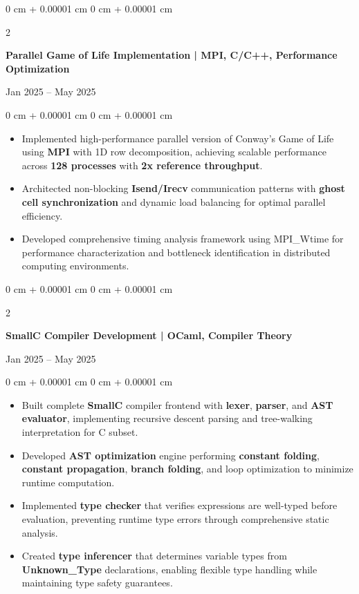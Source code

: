 \documentclass[10pt, letterpaper]{article}
\newenvironment{highlights}{
    \begin{itemize}[
        topsep=0.05 cm,
        parsep=0.05 cm,
        partopsep=0pt,
        itemsep=0pt,
        leftmargin=0 cm + 10pt
    ]
}{
    \end{itemize}
}
\newenvironment{onecolentry}{
    \begin{adjustwidth}{
        0 cm + 0.00001 cm
    }{
        0 cm + 0.00001 cm
    }
}{
    \end{adjustwidth}
}
\newenvironment{twocolentry}[2][]{
    \onecolentry
    \def\secondColumn{#2}
    \setcolumnwidth{\fill, 4.5 cm}
    \begin{paracol}{2}
}{
    \switchcolumn \raggedleft \secondColumn
    \end{paracol}
    \endonecolentry
}
\begin{document}
        \vspace{0.10 cm}
        \begin{twocolentry}{
            Jan 2025 – May 2025
        }
            \textbf{Parallel Game of Life Implementation | MPI, C/C++, Performance Optimization}
        \end{twocolentry}
        \vspace{0.05 cm}
        \begin{onecolentry}
            \begin{highlights}
                \item Implemented high-performance parallel version of Conway's Game of Life using \textbf{MPI} with 1D row decomposition, achieving scalable performance across \textbf{128 processes} with \textbf{2x reference throughput}.
                \item Architected non-blocking \textbf{Isend/Irecv} communication patterns with \textbf{ghost cell synchronization} and dynamic load balancing for optimal parallel efficiency.
                \item Developed comprehensive timing analysis framework using MPI\_Wtime for performance characterization and bottleneck identification in distributed computing environments.
            \end{highlights}
        \end{onecolentry}

        \vspace{0.10 cm}
        \begin{twocolentry}{
            Jan 2025 – May 2025
        }
            \textbf{SmallC Compiler Development | OCaml, Compiler Theory}
        \end{twocolentry}
        \vspace{0.05 cm}
        \begin{onecolentry}
            \begin{highlights}
                \item Built complete \textbf{SmallC} compiler frontend with \textbf{lexer}, \textbf{parser}, and \textbf{AST evaluator}, implementing recursive descent parsing and tree-walking interpretation for C subset.
                \item Developed \textbf{AST optimization} engine performing \textbf{constant folding}, \textbf{constant propagation}, \textbf{branch folding}, and loop optimization to minimize runtime computation.
                \item Implemented \textbf{type checker} that verifies expressions are well-typed before evaluation, preventing runtime type errors through comprehensive static analysis.
                \item Created \textbf{type inferencer} that determines variable types from \textbf{Unknown\_Type} declarations, enabling flexible type handling while maintaining type safety guarantees.
            \end{highlights}
        \end{onecolentry}
\end{document}
